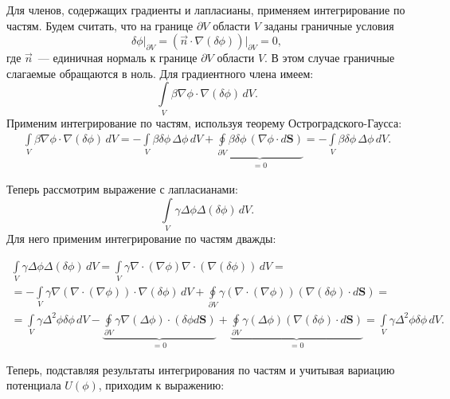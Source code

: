 Для членов, содержащих градиенты и лапласианы, применяем интегрирование по частям. Будем считать, что на границе $\partial V$ области $V$ заданы граничные условия
\begin{equation} \label{gran}
    \delta \phi \bigg|_{\partial V} = ( \Vec{n} \cdot \nabla (\delta \phi)) \bigg|_{\partial V}= 0,
\end{equation}
где $\Vec{n}$~--- единичная нормаль к границе $\partial V$ области $V$. В этом случае граничные слагаемые обращаются в ноль.
Для градиентного члена имеем:
\begin{equation*}
\int \limits_V \beta \nabla \phi \cdot \nabla (\delta \phi) \, d V.
\end{equation*}
Применим интегрирование по частям, используя теорему Остроградского-Гаусса:
\begin{align*}
\int \limits_V \beta \nabla \phi \cdot \nabla (\delta \phi) \, d V = -\int \limits_V \beta \delta \phi \, \Delta \phi \, d V + \underbrace{\oint \limits_{\partial V} \beta \delta \phi \, (\nabla \phi \cdot d\mathbf{S})}_{=0} 
= -\int \limits_V \beta \delta \phi \, \Delta \phi \, d V.
\end{align*}

Теперь рассмотрим выражение с лапласианами:
\begin{equation*}
\int \limits_V \gamma \Delta \phi \Delta (\delta \phi) \, d V.
\end{equation*}
Для него применим интегрирование по частям дважды:

\begin{multline*}
\int \limits_{V} \gamma \Delta \phi \Delta (\delta \phi) \, d V = \int \limits_{V} \gamma \nabla \cdot (\nabla \phi) \nabla \cdot (\nabla (\delta \phi)) \, d V =\\
= -\int \limits_{V} \gamma \nabla (\nabla \cdot (\nabla \phi)) \cdot \nabla (\delta \phi) \, d V + \oint \limits_{\partial V} \gamma (\nabla \cdot (\nabla \phi)) (\nabla (\delta \phi) \cdot d\mathbf{S}) =\\
= \int \limits_{V} \gamma \Delta^2 \phi \delta \phi \, d V - 
\underbrace{\oint \limits_{\partial V} \gamma \nabla (\Delta \phi) \cdot (\delta \phi d\mathbf{S})}_{=0} + \underbrace{\oint \limits_{\partial V} \gamma (\Delta \phi) (\nabla (\delta \phi) \cdot d\mathbf{S})}_{=0} = \int \limits_{V} \gamma \Delta^2 \phi \delta \phi \, d V.
\end{multline*}
    
Теперь, подставляя результаты интегрирования по частям и учитывая вариацию потенциала $U(\phi)$, приходим к выражению:

